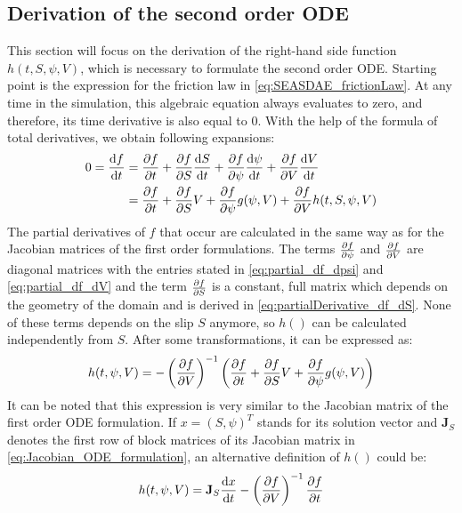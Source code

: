\subsection{Derivation of the second order ODE}
This section will focus on the derivation of the right-hand side function $h(t,S,\psi,V)$, which is necessary to formulate the second order ODE. Starting point is the expression for the friction law in \autoref{eq:SEASDAE_frictionLaw}. At any time in the simulation, this algebraic equation always evaluates to zero, and therefore, its time derivative is also equal to 0. With the help of the formula of total derivatives, we obtain following expansions: 
\begin{align}
	0 = \dv{f}{t} &= \pdv{f}{t} + \pdv{f}{S}\dv{S}{t} + \pdv{f}{\psi}\dv{\psi}{t} +  \pdv{f}{V}\dv{V}{t} \\
					  &= \pdv{f}{t} + \pdv{f}{S}V + \pdv{f}{\psi}g(\psi,V) + \pdv{f}{V}h(t,S,\psi,V)
\end{align}
The partial derivatives of $f$ that occur are calculated in the same way as for the Jacobian matrices of the first order formulations. The terms $\pdv{f}{\psi}$ and $\pdv{f}{V}$ are diagonal matrices with the entries stated in \autoref{eq:partial_df_dpsi} and \autoref{eq:partial_df_dV} and the term $\pdv{f}{S}$ is a constant, full matrix which depends on the geometry of the domain and is derived in \autoref{eq:partialDerivative_df_dS}. None of these terms depends on the slip $S$ anymore, so $h()$ can be calculated independently from $S$. After some transformations, it can be expressed as: 
\begin{equation}
	\label{eq:2nd_order_ODE_formulation_sum_of_Jacobians}
	h(t,\psi,V) = -\left(\pdv{f}{V}\right)^{-1}\left(\pdv{f}{t} + \pdv{f}{S}V + \pdv{f}{\psi}g(\psi,V)\right)
\end{equation}
It can be noted that this expression is very similar to the Jacobian matrix of the first order ODE formulation. If $x=(S,\psi)^T$ stands for its solution vector and $\mathbf{J}_{S}$ denotes the first row of block matrices of its Jacobian matrix in \autoref{eq:Jacobian_ODE_formulation}, an alternative definition of $h()$ could be: 
\begin{equation}
	h(t,\psi,V) = \mathbf{J}_{S}\dv{x}{t} -\left(\pdv{f}{V}\right)^{-1}\pdv{f}{t}
\end{equation}

